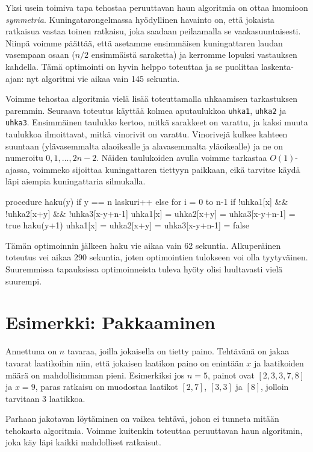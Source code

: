 Yksi usein toimiva tapa tehostaa peruuttavan haun algoritmia
on ottaa huomioon \emph{symmetria}.
Kuningatarongelmassa hyödyllinen havainto on,
että jokaista ratkaisua vastaa toinen ratkaisu,
joka saadaan peilaamalla se vaakasuuntaisesti.
Niinpä voimme päättää, että asetamme ensimmäisen kuningattaren
laudan vasempaan osaan ($n/2$ ensimmäistä saraketta)
ja kerromme lopuksi vastauksen kahdella.
Tämä optimointi on hyvin helppo toteuttaa ja se puolittaa
laskenta-ajan: nyt algoritmi vie aikaa vain 145 sekuntia.

Voimme tehostaa algoritmia vielä lisää toteuttamalla
uhkaamisen tarkastuksen paremmin.
Seuraava toteutus käyttää kolmea aputaulukkoa
\texttt{uhka1}, \texttt{uhka2} ja \texttt{uhka3}.
Ensimmäinen taulukko kertoo, mitkä sarakkeet on varattu,
ja kaksi muuta taulukkoa ilmoittavat, mitkä vinorivit on varattu.
Vinorivejä kulkee kahteen suuntaan
(ylävasemmalta alaoikealle ja alavasemmalta yläoikealle)
ja ne on numeroitu $0,1,\dots,2n-2$.
Näiden taulukoiden avulla voimme tarkastaa $O(1)$-ajassa,
voimmeko sijoittaa kuningattaren tiettyyn paikkaan,
eikä tarvitse käydä läpi aiempia kuningattaria silmukalla.

\begin{code}
procedure haku(y)
    if y == n
        laskuri++
    else
        for i = 0 to n-1
            if !uhka1[x] && !uhka2[x+y] && !uhka3[x-y+n-1]
                uhka1[x] = uhka2[x+y] = uhka3[x-y+n-1] = true
                haku(y+1)
                uhka1[x] = uhka2[x+y] = uhka3[x-y+n-1] = false
\end{code}

Tämän optimoinnin jälkeen haku vie aikaa vain 62 sekuntia.
Alkuperäinen toteutus vei aikaa 290 sekuntia,
joten optimointien tulokseen voi olla tyytyväinen.
Suuremmissa tapauksissa optimoinneista tuleva hyöty olisi
luultavasti vielä suurempi.

\section{Esimerkki: Pakkaaminen}

Annettuna on $n$ tavaraa, joilla jokaisella on tietty paino.
Tehtävänä on jakaa tavarat laatikoihin niin,
että jokaisen laatikon paino on enintään $x$ ja
laatikoiden määrä on mahdollisimman pieni.
Esimerkiksi jos $n=5$, painot ovat $[2,3,3,7,8]$ ja $x=9$,
paras ratkaisu on muodostaa laatikot $[2,7]$, $[3,3]$ ja $[8]$,
jolloin tarvitaan 3 laatikkoa.

Parhaan jakotavan löytäminen on vaikea tehtävä,
johon ei tunneta mitään tehokasta algoritmia.
Voimme kuitenkin toteuttaa peruuttavan haun algoritmin,
joka käy läpi kaikki mahdolliset ratkaisut.

